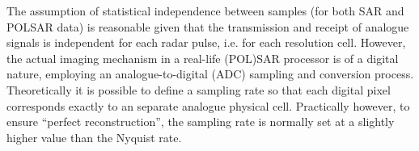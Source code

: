 \documentclass[journal]{IEEEtran}
\begin{document}

The assumption of statistical independence between samples (for both SAR and POLSAR data) is reasonable given that 
  the transmission and receipt of analogue signals is independent for each radar pulse, i.e. for each resolution cell.
However, the actual imaging mechanism in a real-life (POL)SAR processor is of a digital nature,
  employing an analogue-to-digital (ADC) sampling and conversion process.  
Theoretically it is possible to define a sampling rate so that each digital pixel corresponds exactly to an separate analogue physical cell.
Practically however, to ensure ``perfect reconstruction'', the sampling rate is normally set at a slightly higher value than the Nyquist rate. 
\end{document}
